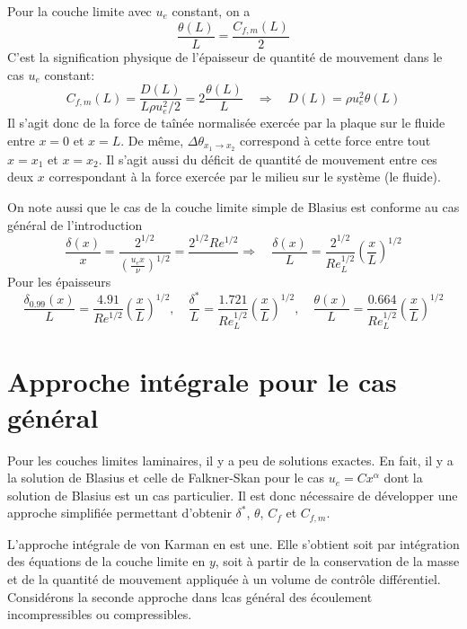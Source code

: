    Pour la couche limite avec $u_e$ constant, on a
    \begin{equation}
      \frac{\theta(L)}{L} = \frac{C_{f,m}(L)}{2}
    \end{equation}
    C'est la signification physique de l'épaisseur de quantité de mouvement dans le cas $u_e$ constant:
    \begin{equation}
      C_{f,m}(L) = \frac{D(L)}{L \rho u_e^2/2} = 2\frac{\theta(L)}{L} \quad \Rightarrow \quad D(L) = \rho u_e^2 \theta(L)
    \end{equation}
    Il s'agit donc de la force de taînée normalisée exercée par la plaque sur le fluide entre $x=0$ et $x=L$. De même, $\Delta\theta_{x_1 \rightarrow x_2}$ correspond à cette force entre tout $x=x_1$ et $x=x_2$. Il s'agit aussi du déficit de quantité de mouvement entre ces deux $x$ correspondant à la force exercée par le milieu sur le système (le fluide).

    On note aussi que le cas de la couche limite simple de Blasius est conforme au cas général de l'introduction
    \begin{equation}
      \frac{\delta(x)}{x} = \frac{2^{1/2}}{\left(\frac{u_e x}{\nu}\right)^{1/2}} = \frac{2^{1/2}{Re^{1/2}}} \quad \Rightarrow \quad \frac{\delta(x)}{L} = \frac{2^{1/2}}{Re^{1/2}_L} \left(\frac{x}{L}\right)^{1/2}
    \end{equation}
    Pour les épaisseurs
    \begin{equation}
      \frac{\delta_{0.99}(x)}{L} = \frac{4.91}{Re^{1/2}}\left(\frac{x}{L}\right)^{1/2}, \quad \frac{\delta^*}{L} = \frac{1.721}{Re^{1/2}_L} \left(\frac{x}{L}\right)^{1/2}, \quad \frac{\theta(x)}{L} = \frac{0.664}{Re^{1/2}_L} \left(\frac{x}{L}\right)^{1/2}
    \end{equation}

  \section{Approche intégrale pour le cas général}
    Pour les couches limites laminaires, il y a peu de solutions exactes. En fait, il y a la solution de Blasius et celle de Falkner-Skan pour le cas $u_e = C x^\alpha$ dont la solution de Blasius est un cas particulier. Il est donc nécessaire de développer une approche simplifiée permettant d'obtenir $\delta^*$, $\theta$, $C_f$ et $C_{f, m}$.

    L'approche intégrale de von Karman en est une. Elle s'obtient soit par intégration des équations de la couche limite en $y$, soit à partir de la conservation de la masse et de la quantité de mouvement appliquée à un volume de contrôle différentiel. Considérons la seconde approche dans lcas général des écoulement incompressibles ou compressibles.

